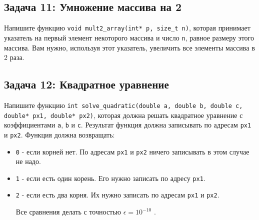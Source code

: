 \documentclass{article}
\begin{document}
\subsection*{Задача 11: Умножение массива на 2}
Напишите функцию \texttt{void mult2\_array(int* p, size\_t n)}, которая принимает указатель на первый элемент некоторого массива и число \texttt{n}, равное размеру этого массива. Вам нужно, используя этот указатель, увеличить все элементы массива в 2 раза.


\subsection*{Задача 12: Квадратное уравнение}
Напишите функцию \texttt{int solve\_quadratic(double a, double b, double c, double* px1, double* px2)}, которая должна решать квадратное уравнение с коэффициентами \texttt{a}, \texttt{b} и \texttt{c}. Результат функция должна записывать по адресам \texttt{px1} и \texttt{px2}. Функция должна возвращать:
\begin{itemize}
\item \texttt{0} - если корней нет. По адресам \texttt{px1} и \texttt{px2} ничего записывать в этом случае не надо.
\item \texttt{1} - если есть один корень. Его нужно записать по адресу \texttt{px1}.
\item \texttt{2} - если есть два корня. Их нужно записать по адресам \texttt{px1} и \texttt{px2}.

Все сравнения делать с точностью $\epsilon = 10^{-10}$ .


\end{itemize}
\end{document}
